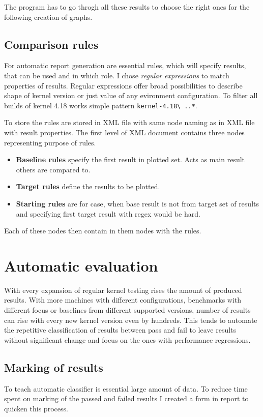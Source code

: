 The program has to go throgh all these results to choose the right ones for the
following creation of graphs.

\section{Comparison rules}
For automatic report generation are essential rules, which will specify results,
that can be used and in which role. I chose \emph{regular expressions} to match
properties of results. Regular expressions offer broad possibilities to describe
shape of kernel version or just value of any evironment configuration. To filter
all builds of kernel 4.18 works simple pattern \texttt{kernel-4.18\textbackslash
..*}.

To store the rules are stored in XML file with same node naming as in XML file
with result properties. The first level of XML document contains three nodes
representing purpose of rules.
\begin{itemize}
  \item \textbf{Baseline rules} specify the first result in plotted set. Acts as
    main result others are compared to.
  \item \textbf{Target rules} define the results to be plotted.
  \item \textbf{Starting rules} are for case, when base result is not from
    target set of results and specifying first target result with regex would be
    hard.
\end{itemize}
Each of these nodes then contain in them nodes with the rules.


\chapter{Automatic evaluation}
With every expansion of regular kernel testing rises the amount of produced
results. With more machines with different configurations, benchmarks with
different focus or baselines from different supported versions, number of results
can rise with every new kernel version even by hundreds. This tends to automate
the repetitive classification of results between pass and fail to leave results
without significant change and focus on the ones with performance regressions.

\section{Marking of results}
To teach automatic classifier is essential large amount of data. To reduce
time spent on marking of the passed and failed results I created a form in
report to quicken this process.

